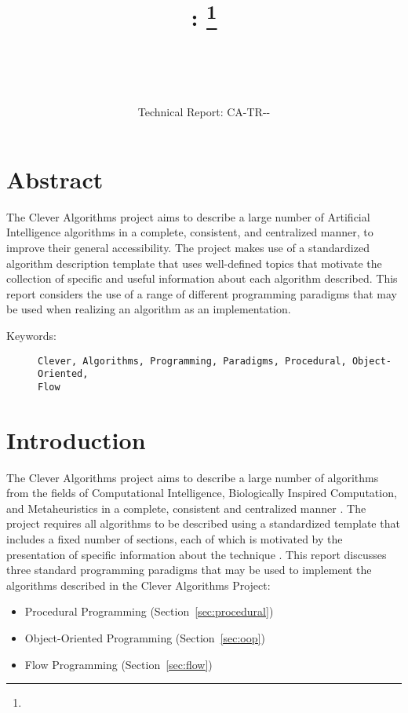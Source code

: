 \documentclass[a4paper, 11pt]{article}
\title{{\myreporttitle}: \myreportsubtitle\footnote{\myreportlicense}}
\author{\myreportauthor\\{\myreportemail}\\\small\myreportproject}
\date{\myreportfulldate\\{\small{Technical Report: CA-TR-{\myreportdate}-\myreportversion}}}
\begin{document}
\maketitle

\section*{Abstract} 
The Clever Algorithms project aims to describe a large number of Artificial Intelligence algorithms in a complete, consistent, and centralized manner, to improve their general accessibility. 
The project makes use of a standardized algorithm description template that uses well-defined topics that motivate the collection of specific and useful information about each algorithm described.
This report considers the use of a range of different programming paradigms that may be used when realizing an algorithm as an implementation.

\begin{description}
	\item[Keywords:] {\small\texttt{Clever, Algorithms, Programming, Paradigms, Procedural, Object-Oriented, \\Flow}}
\end{description} 

\section{Introduction}
\label{sec:introduction}
The Clever Algorithms project aims to describe a large number of algorithms from the fields of Computational Intelligence, Biologically Inspired Computation, and Metaheuristics in a complete, consistent and centralized manner \cite{Brownlee2010}.
The project requires all algorithms to be described using a standardized template that includes a fixed number of sections, each of which is motivated by the presentation of specific information about the technique \cite{Brownlee2010a}.
This report discusses three standard programming paradigms that may be used to implement the algorithms described in the Clever Algorithms Project:
\begin{itemize}
	\item Procedural Programming (Section~\ref{sec:procedural})
	\item Object-Oriented Programming (Section~\ref{sec:oop})
	\item Flow Programming (Section~\ref{sec:flow})
\end{itemize}
\end{document}
